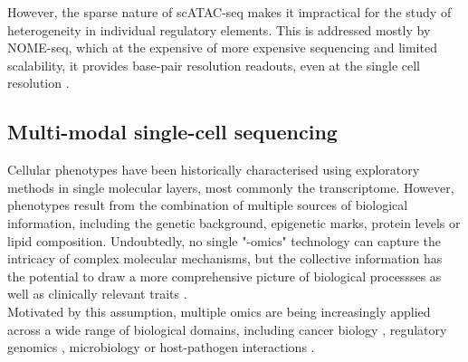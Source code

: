 However, the sparse nature of scATAC-seq makes it impractical for the study of heterogeneity in individual regulatory elements. This is addressed mostly by NOME-seq, which at the expensive of more expensive sequencing and limited scalability, it provides base-pair resolution readouts, even at the single cell resolution \cite{Pott2016}.


\subsection{Multi-modal single-cell sequencing}
Cellular phenotypes have been historically characterised using exploratory methods in single molecular layers, most commonly the transcriptome. However, phenotypes result from the combination of multiple sources of biological information, including the genetic background, epigenetic marks, protein levels or lipid composition. Undoubtedly, no single "-omics" technology can capture the intricacy of complex molecular mechanisms, but the collective information has the potential to draw a more comprehensive picture of biological processses as well as clinically relevant traits \cite{Hasin2017,Ritchie2015}.\\
Motivated by this assumption, multiple omics are being increasingly applied across a wide range of biological domains, including cancer biology \cite{Akavia2010,Gerstung2015}, regulatory genomics \cite{Chen2016}, microbiology \cite{Kim2016} or host-pathogen interactions \cite{Soderholm2016}.\\ 

